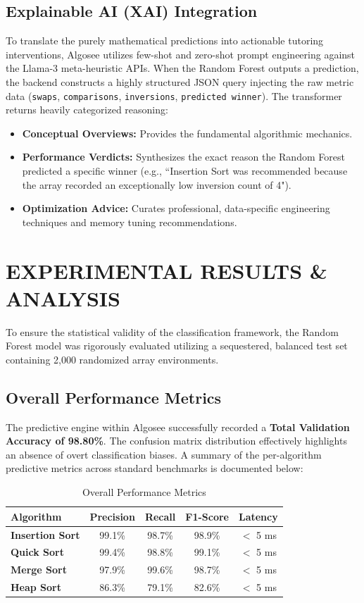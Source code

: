 \documentclass[conference]{IEEEtran}
\begin{document}
\subsection{Explainable AI (XAI) Integration}
To translate the purely mathematical predictions into actionable tutoring interventions, Algosee utilizes few-shot and zero-shot prompt engineering against the Llama-3 meta-heuristic APIs. When the Random Forest outputs a prediction, the backend constructs a highly structured JSON query injecting the raw metric data (\texttt{swaps}, \texttt{comparisons}, \texttt{inversions}, \texttt{predicted winner}). The transformer returns heavily categorized reasoning:
\begin{itemize}
\item \textbf{Conceptual Overviews:} Provides the fundamental algorithmic mechanics.
\item \textbf{Performance Verdicts:} Synthesizes the exact reason the Random Forest predicted a specific winner (e.g., ``Insertion Sort was recommended because the array recorded an exceptionally low inversion count of 4").
\item \textbf{Optimization Advice:} Curates professional, data-specific engineering techniques and memory tuning recommendations.
\end{itemize}

\section{EXPERIMENTAL RESULTS \& ANALYSIS}
To ensure the statistical validity of the classification framework, the Random Forest model was rigorously evaluated utilizing a sequestered, balanced test set containing 2,000 randomized array environments.

\subsection{Overall Performance Metrics}
The predictive engine within Algosee successfully recorded a \textbf{Total Validation Accuracy of 98.80\%}. The confusion matrix distribution effectively highlights an absence of overt classification biases. A summary of the per-algorithm predictive metrics across standard benchmarks is documented below:

\begin{table}[h]
\centering
\caption{Overall Performance Metrics}
\label{tab:performance_metrics}
\begin{tabular}{|l|c|c|c|c|}
\hline
\textbf{Algorithm} & \textbf{Precision} & \textbf{Recall} & \textbf{F1-Score} & \textbf{Latency} \\
\hline
\textbf{Insertion Sort} & 99.1\% & 98.7\% & 98.9\% & $<$ 5 ms \\
\textbf{Quick Sort} & 99.4\% & 98.8\% & 99.1\% & $<$ 5 ms \\
\textbf{Merge Sort} & 97.9\% & 99.6\% & 98.7\% & $<$ 5 ms \\
\textbf{Heap Sort} & 86.3\% & 79.1\% & 82.6\% & $<$ 5 ms \\
\hline
\end{tabular}
\end{table}
\end{document}
